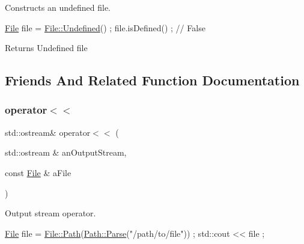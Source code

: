 Constructs an undefined file. 


\begin{DoxyCode}
\hyperlink{classlibrary_1_1core_1_1fs_1_1_file_a6f3f0d79545ac9984c6f49432f0c6c39}{File} file = \hyperlink{classlibrary_1_1core_1_1fs_1_1_file_af45fa5c36c359a979149845ef06586e6}{File::Undefined}() ;
file.isDefined() ; \textcolor{comment}{// False}
\end{DoxyCode}


\begin{DoxyReturn}{Returns}
Undefined file 
\end{DoxyReturn}


\subsection{Friends And Related Function Documentation}
\mbox{\label{classlibrary_1_1core_1_1fs_1_1_file_a82ce9f27653427d53ecb90de978f4f68}} 
\subsubsection{\texorpdfstring{operator$<$$<$}{operator<<}}
{\footnotesize\ttfamily std\+::ostream\& operator$<$$<$ (\begin{DoxyParamCaption}\item[{std\+::ostream \&}]{an\+Output\+Stream,  }\item[{const \hyperlink{classlibrary_1_1core_1_1fs_1_1_file}{File} \&}]{a\+File }\end{DoxyParamCaption})\hspace{0.3cm}{\ttfamily [friend]}}



Output stream operator. 


\begin{DoxyCode}
\hyperlink{classlibrary_1_1core_1_1fs_1_1_file_a6f3f0d79545ac9984c6f49432f0c6c39}{File} file = \hyperlink{classlibrary_1_1core_1_1fs_1_1_file_a72d6cdf8bb7e299889c6149e2b8a6cc7}{File::Path}(\hyperlink{classlibrary_1_1core_1_1fs_1_1_path_a6ba644b6609507e724c217bf2020f5ae}{Path::Parse}(\textcolor{stringliteral}{"/path/to/file"})) ;
std::cout << file ;
\end{DoxyCode}



